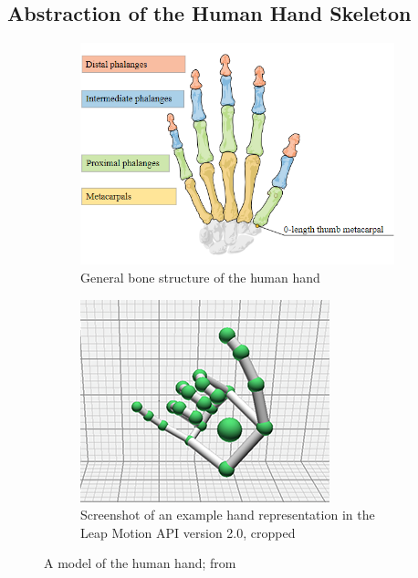 \documentclass[hyperref, bachelorofscience]{cgvpub}
\begin{document}
\subsection{Abstraction of the Human Hand Skeleton}
\begin{figure}
	\begin{subfigure}{.5\linewidth}
		\includegraphics[width=\linewidth]{../pics/leap_anat}
		\caption{General bone structure of the human hand}
		\label{fig:hand_model:anat}
	\end{subfigure}
	\hfill
	\begin{subfigure}{.47\linewidth}
		\includegraphics[width=\linewidth]{../pics/leap_example}
		\caption{Screenshot of an example hand representation in the Leap Motion API version 2.0, cropped}
		\label{fig:hand_model:leap}
	\end{subfigure}
	\caption{A model of the human hand; from \cite{leaphand}}
	\label{fig:hand_model}
\end{figure}
\end{document}
